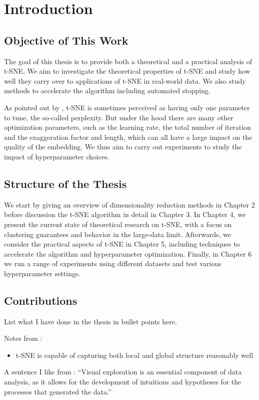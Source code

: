 \chapter{Introduction}

\section*{Objective of This Work}
The goal of this thesis is to provide both a theoretical and a practical analysis of t-SNE. 
We aim to investigate the theoretical properties of t-SNE and study how well they carry over to applications of t-SNE in real-world data. 
We also study methods to accelerate the algorithm including automated stopping.

As pointed out by \cite{KoBe19SingleCell}, t-SNE is sometimes perceived as having only one parameter to tune, the so-called perplexity. 
But under the hood there are many other optimization parameters, such as the learning rate, the total number of iteration and the exaggeration factor and length, which can all have a large impact on the quality of the embedding. 
We thus aim to carry out experiments to study the impact of hyperparameter choices. 
 

\section*{Structure of the Thesis}
We start by giving an overview of dimensionality reduction methods in Chapter 2 before discussion the t-SNE algorithm in detail in Chapter 3. 
In Chapter 4, we present the current state of theoretical research on t-SNE, with a focus on clustering guarantees and behavior in the large-data limit. 
Afterwards, we consider the practical aspects of t-SNE in Chapter 5, including techniques to accelerate the algorithm and hyperparameter optimization. 
Finally, in Chapter 6 we run a range of experiments using different datasets and test various hyperparameter settings. 

\section*{Contributions}
List what I have done in the thesis in bullet points here. 

Notes from \cite{vdMaa08}: 
\begin{itemize}
    \item t-SNE is capable of capturing both local and global structure reasonably well 
\end{itemize}
A sentence I like from \cite{vdMaa14}: \enquote{Visual exploration is an essential component of data analysis, as it allows for the development of intuitions and hypotheses for the processes that generated the data.}


